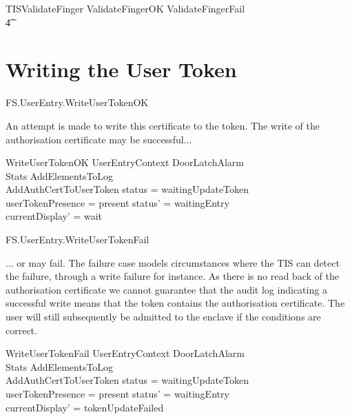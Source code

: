 \begin{zed}
        TISValidateFinger  ValidateFingerOK \lor ValidateFingerFail
\\ \t4  \lor [~ UserTokenTorn | status = gotFinger ~]
\end{zed}

\section{Writing the User Token}


\begin{traceunit}{FS.UserEntry.WriteUserTokenOK}
\end{traceunit}

An attempt is made to write this certificate to the token. The write of
the authorisation certificate may be successful...

\begin{schema}{WriteUserTokenOK}
	UserEntryContext
\also
	\Xi DoorLatchAlarm
\\      \Xi Stats
\also
        AddElementsToLog
\\      AddAuthCertToUserToken
\where
	status = waitingUpdateToken
\\      userTokenPresence = present
\also
        status' = waitingEntry
\\      currentDisplay' = wait
\end{schema}


\begin{traceunit}{FS.UserEntry.WriteUserTokenFail}
\end{traceunit}

... or may fail. The failure case models circumstances where the TIS
can detect the failure, through a write failure for instance. 
As there is no read back of the authorisation certificate we cannot
guarantee that the audit log indicating a successful write means that
the token contains the authorisation certificate. The user will still
subsequently be admitted to the enclave if the conditions are correct. 

\begin{schema}{WriteUserTokenFail}
	UserEntryContext
\also
	\Xi DoorLatchAlarm
\\      \Xi Stats
\also
        AddElementsToLog
\\      AddAuthCertToUserToken
\where
	status = waitingUpdateToken
\\      userTokenPresence = present
\also
        status' = waitingEntry
\\      currentDisplay' = tokenUpdateFailed
\end{schema}



